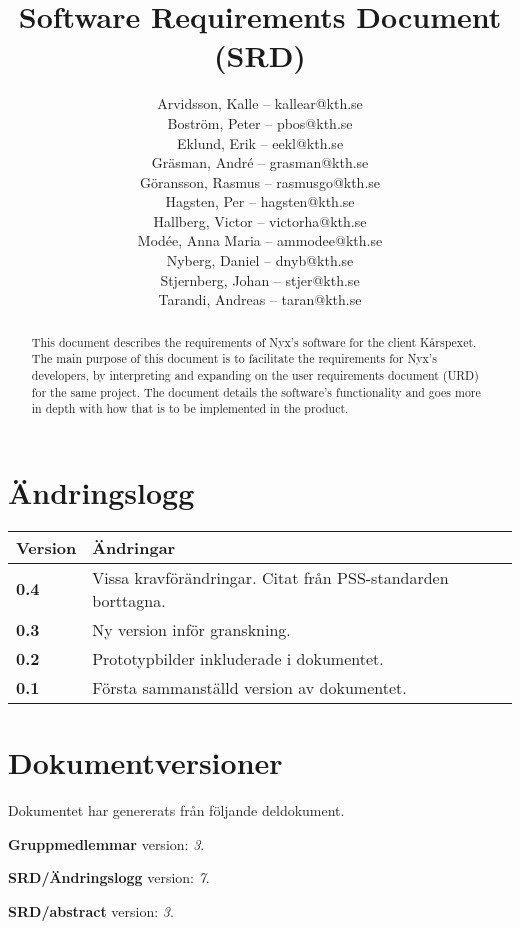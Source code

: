 \documentclass[a4paper, twoside, 11pt, titlepage]{article}
\author{
	\small
	Arvidsson, Kalle -- kallear@kth.se\\
	Boström, Peter -- pbos@kth.se\\
	Eklund, Erik -- eekl@kth.se\\
	Gräsman, André -- grasman@kth.se\\
	Göransson, Rasmus -- rasmusgo@kth.se\\
	Hagsten, Per -- hagsten@kth.se\\
	Hallberg, Victor -- victorha@kth.se\\
	Modée, Anna Maria -- ammodee@kth.se\\
	Nyberg, Daniel -- dnyb@kth.se\\
	Stjernberg, Johan -- stjer@kth.se\\
	Tarandi, Andreas -- taran@kth.se
	}
\title{Software Requirements Document (SRD)}
\begin{document}
\maketitle

\clearpage
\thispagestyle{empty}
\mbox{}
\newpage

\begin{abstract}
	This document describes the requirements of Nyx's software for the client Kårspexet. The main purpose of this document is to facilitate the requirements for Nyx's developers, by interpreting and expanding on the user requirements document (URD) for the same project. The document details the software's functionality and goes more in depth with how that is to be implemented in the product.
\end{abstract}

\newpage

\setcounter{page}{1}

\startfooter

\clearpage
\section*{Ändringslogg}


\begin{tabular} { p{2.6cm} p{12.5cm} }
	\hline
	\sffamily\textbf{Version} & \sffamily\textbf{Ändringar } \\
	\hline
	\sffamily\textbf{0.4} & Vissa kravförändringar. Citat från PSS-standarden borttagna.  \\
	\hline
	\sffamily\textbf{0.3} & Ny version inför granskning.  \\
	\hline
	\sffamily\textbf{0.2} & Prototypbilder inkluderade i dokumentet.  \\
	\hline
	\sffamily\textbf{0.1} & Första sammanställd version av dokumentet.  \\
	\hline
\end{tabular}


\clearpage
\section*{Dokumentversioner}


Dokumentet har genererats från följande deldokument.

\textbf{Gruppmedlemmar} version: \emph{3}.

\textbf{SRD/Ändringslogg} version: \emph{7}.

\textbf{SRD/abstract} version: \emph{3}.
\end{document}
